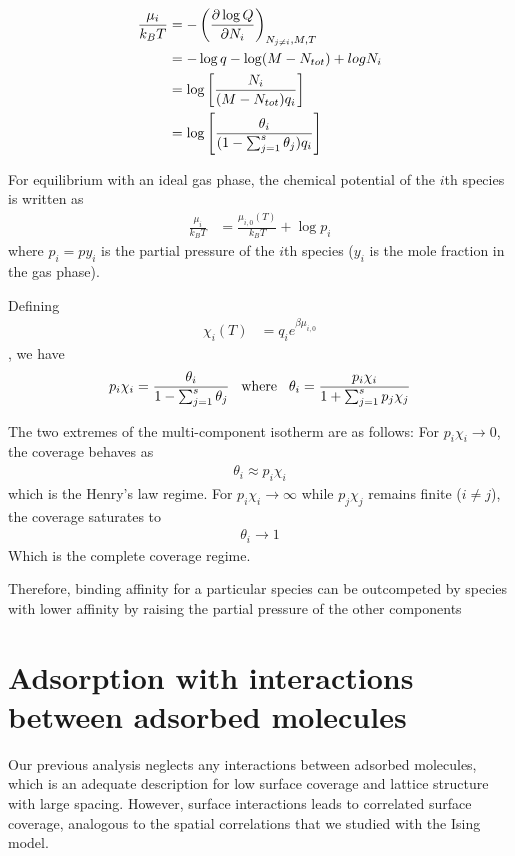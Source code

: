 \documentclass[book.tex]{subfiles}
\begin{document}
\begin{align}
\frac{\mu_i}{k_BT} &= -\left( \frac{\partial \log Q}{\partial N_i}\right)_{N_{j \neq i},M,T} \notag\\
&= -\log q -\log(M-N_{tot}) + log N_i \notag\\
&= \log \left[ \frac{N_i}{(M-N_{tot})q_i} \right] \notag\\
&= \log \left[ \frac{\theta_i}{(1-\sum_{j=1}^s \theta_j)q_i} \right] \notag
\end{align}

For equilibrium with an ideal gas phase, the chemical potential of the $i$th species is written as 
\begin{align}
\frac{\mu_i}{k_BT} &= \frac{\mu_{i,0}(T)}{k_BT} + \log p_i
\end{align}
where $p_i = py_i$ is the partial pressure of the $i$th species ($y_i$ is the mole fraction in the gas phase).

Defining 
\begin{align}
\chi_i(T) &= q_ie^{\beta \mu_{i,0}}
\end{align}, 
we have
\begin{align}
p_i\chi_i = \frac{\theta_i}{1 - \sum_{j=1}^s \theta_j} \hspace{0.3cm} \text{where} \hspace{0.3cm} \theta_i = \frac{p_i\chi_i}{1 + \sum_{j=1}^s p_j\chi_j}
\end{align} 

The two extremes of the multi-component isotherm are as follows: For $p_i\chi_i \rightarrow 0$, the coverage behaves as 
\begin{align}
\theta_i \approx p_i\chi_i
\end{align}
which is the Henry's law regime.
For $p_i\chi_i \rightarrow \infty $ while $p_j\chi_j$ remains finite ($i \neq j$), the coverage saturates to 
\begin{align}\theta_i \rightarrow 1
\end{align}
Which is the complete coverage regime.

Therefore, binding affinity for a particular species can be outcompeted by species with lower affinity by raising the partial pressure of the other components

\section{Adsorption with interactions between adsorbed molecules}
Our previous analysis neglects any interactions between adsorbed molecules, which is an adequate description for low surface coverage and lattice structure with large spacing. However, surface interactions leads to correlated surface coverage,
analogous to the spatial correlations that we studied with the Ising model.
\end{document}
